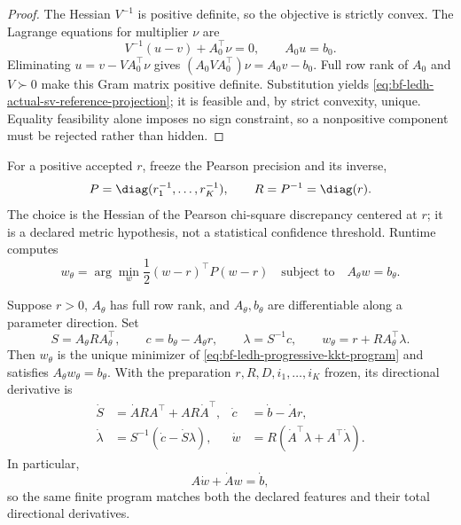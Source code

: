 \begin{proof}
The Hessian \(V^{-1}\) is positive definite, so the objective is strictly
convex.  The Lagrange equations for multiplier \(\nu\) are
\[
  V^{-1}(u-v)+A_0^\top\nu=0,
  \qquad A_0u=b_0.
\]
Eliminating \(u=v-VA_0^\top\nu\) gives
\(
  (A_0VA_0^\top)\nu=A_0v-b_0
\).
Full row rank of \(A_0\) and \(V\succ0\) make this Gram matrix positive
definite.  Substitution yields
\eqref{eq:bf-ledh-actual-sv-reference-projection}; it is feasible and, by
strict convexity, unique.  Equality feasibility alone imposes no sign
constraint, so a nonpositive component must be rejected rather than hidden.
\end{proof}

For a positive accepted \(r\), freeze the Pearson precision and its inverse,
\begin{equation}
\label{eq:bf-ledh-actual-sv-pearson-metric}
  P=\diag(r_1^{-1},\ldots,r_K^{-1}),
  \qquad R=P^{-1}=\diag(r).
\end{equation}
The choice is the Hessian of the Pearson chi-square discrepancy centered at
\(r\); it is a declared metric hypothesis, not a statistical confidence
threshold.  Runtime computes
\begin{equation}
\label{eq:bf-ledh-progressive-kkt-program}
  w_\theta
  =\arg\min_w\frac12(w-r)^\top P(w-r)
  \quad\text{subject to}\quad A_\theta w=b_\theta.
\end{equation}

\begin{proposition}
\label{prop:bf-ledh-progressive-kkt-chart}
Suppose \(r>0\), \(A_\theta\) has full row rank, and \(A_\theta,b_\theta\) are
differentiable along a parameter direction.  Set
\begin{equation}
\label{eq:bf-ledh-progressive-kkt-solution}
  S=A_\theta R A_\theta^\top,\qquad
  c=b_\theta-A_\theta r,\qquad
  \lambda=S^{-1}c,\qquad
  w_\theta=r+RA_\theta^\top\lambda.
\end{equation}
Then \(w_\theta\) is the unique minimizer of
\eqref{eq:bf-ledh-progressive-kkt-program} and satisfies
\(A_\theta w_\theta=b_\theta\).  With the preparation
\(r,R,D,i_1,\ldots,i_K\) frozen, its directional derivative is
\begin{align}
  \dot S&=\dot ARA^\top+AR\dot A^\top,&
  \dot c&=\dot b-\dot A r,
  \label{eq:bf-ledh-actual-sv-kkt-jvp-a}\\
  \dot\lambda&=S^{-1}(\dot c-\dot S\lambda),&
  \dot w&=R(\dot A^\top\lambda+A^\top\dot\lambda).
  \label{eq:bf-ledh-actual-sv-kkt-jvp-b}
\end{align}
In particular,
\begin{equation}
\label{eq:bf-ledh-actual-sv-differentiated-constraint}
  A\dot w+\dot A w=\dot b,
\end{equation}
so the same finite program matches both the declared features and their total
directional derivatives.
\end{proposition}

